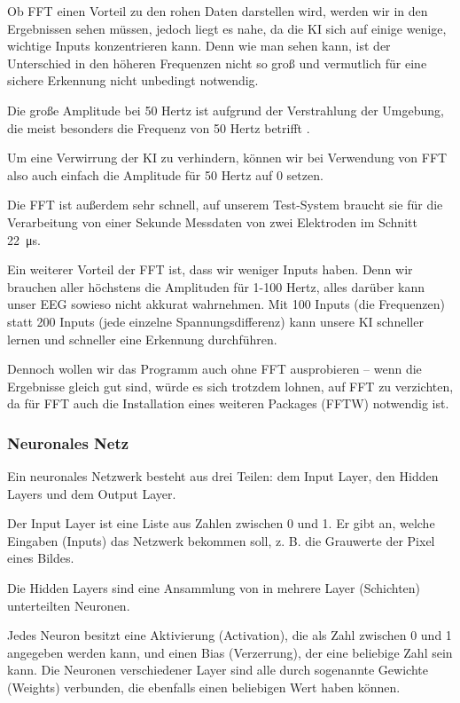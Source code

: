 \documentclass{scrartcl}
\begin{document}
	Ob FFT einen Vorteil zu den rohen Daten darstellen wird, werden wir in den Ergebnissen sehen müssen, jedoch liegt es nahe, da die KI sich auf einige wenige, wichtige Inputs konzentrieren kann. Denn wie man sehen kann, ist der Unterschied in den höheren Frequenzen nicht so groß und vermutlich für eine sichere Erkennung nicht unbedingt notwendig.

	Die große Amplitude bei 50 Hertz ist aufgrund der Verstrahlung der Umgebung, die meist besonders die Frequenz von 50 Hertz betrifft \cite{Praktikum}. %

	Um eine Verwirrung der KI zu verhindern, können wir bei Verwendung von FFT also auch einfach die Amplitude für 50 Hertz auf 0 setzen.

	Die FFT ist außerdem sehr schnell, auf unserem Test-System braucht sie für die Verarbeitung von einer Sekunde Messdaten von zwei Elektroden im Schnitt \qty{22}{\micro\second}.

	Ein weiterer Vorteil der FFT ist, dass wir weniger Inputs haben. Denn wir brauchen aller höchstens die Amplituden für 1-100 Hertz, alles darüber kann unser EEG sowieso nicht akkurat wahrnehmen. Mit 100 Inputs (die Frequenzen) statt 200 Inputs (jede einzelne Spannungsdifferenz) kann unsere KI schneller lernen und schneller eine Erkennung durchführen.

	Dennoch wollen wir das Programm auch ohne FFT ausprobieren -- wenn die Ergebnisse gleich gut sind, würde es sich trotzdem lohnen, auf FFT zu verzichten, da für FFT auch die Installation eines weiteren Packages (FFTW) notwendig ist. 

	\subsubsection{Neuronales Netz}

	Ein neuronales Netzwerk besteht aus drei Teilen: dem Input Layer, den Hidden Layers und dem Output Layer.

	Der Input Layer ist eine Liste aus Zahlen zwischen 0 und 1. Er gibt an, welche Eingaben (Inputs) das Netzwerk bekommen soll, z. B. die Grauwerte der Pixel eines Bildes.
	
	Die Hidden Layers sind eine Ansammlung von in mehrere Layer (Schichten) unterteilten Neuronen.
	
	Jedes Neuron besitzt eine Aktivierung (Activation), die als Zahl zwischen 0 und 1 angegeben werden kann, und einen Bias (Verzerrung), der eine beliebige Zahl sein kann. Die Neuronen verschiedener Layer sind alle durch sogenannte Gewichte (Weights) verbunden, die ebenfalls einen beliebigen Wert haben können.
\end{document}
